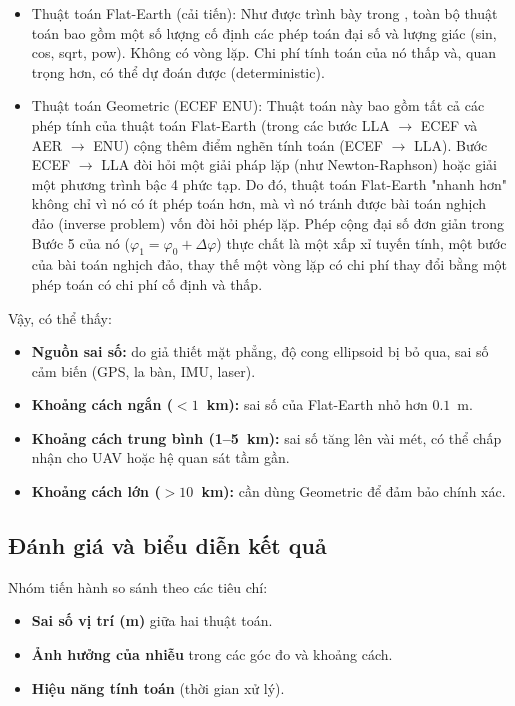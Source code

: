\begin{itemize}
    \item Thuật toán Flat-Earth (cải tiến): Như được trình bày trong , toàn bộ thuật toán bao gồm một số lượng cố định các phép toán đại số và lượng giác (sin, cos, sqrt, pow). Không có vòng lặp. Chi phí tính toán của nó thấp và, quan trọng hơn, có thể dự đoán được (deterministic).
    \item Thuật toán Geometric (ECEF ENU):
Thuật toán này bao gồm tất cả các phép tính của thuật toán Flat-Earth (trong các bước LLA $\rightarrow$ ECEF và AER $\rightarrow$ ENU) cộng thêm điểm nghẽn tính toán (ECEF $\rightarrow$ LLA).
Bước ECEF $\rightarrow$ LLA  đòi hỏi một giải pháp lặp (như Newton-Raphson) hoặc giải một phương trình bậc 4 phức tạp.
Do đó, thuật toán Flat-Earth "nhanh hơn" không chỉ vì nó có ít phép toán hơn, mà vì nó tránh được bài toán nghịch đảo (inverse problem) vốn đòi hỏi phép lặp. Phép cộng đại số đơn giản trong Bước 5 của nó ($\varphi_1 = \varphi_0 + \Delta\varphi$) thực chất là một xấp xỉ tuyến tính, một bước của bài toán nghịch đảo, thay thế một vòng lặp có chi phí thay đổi bằng một phép toán có chi phí cố định và thấp.

\end{itemize}

Vậy, có thể thấy:

\begin{itemize}
    \item \textbf{Nguồn sai số:} do giả thiết mặt phẳng, độ cong ellipsoid bị bỏ qua, sai số cảm biến (GPS, la bàn, IMU, laser).
    \item \textbf{Khoảng cách ngắn ($<1$~km):} sai số của Flat-Earth nhỏ hơn $0.1$~m.
    \item \textbf{Khoảng cách trung bình (1--5~km):} sai số tăng lên vài mét, có thể chấp nhận cho UAV hoặc hệ quan sát tầm gần.
    \item \textbf{Khoảng cách lớn ($>10$~km):} cần dùng Geometric để đảm bảo chính xác.
\end{itemize}

\subsection{Đánh giá và biểu diễn kết quả}
Nhóm tiến hành so sánh theo các tiêu chí:
\begin{itemize}
    \item \textbf{Sai số vị trí (m)} giữa hai thuật toán.
    \item \textbf{Ảnh hưởng của nhiễu} trong các góc đo và khoảng cách.
    \item \textbf{Hiệu năng tính toán} (thời gian xử lý).
\end{itemize}

